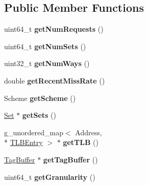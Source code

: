 \subsection*{Public Member Functions}
\begin{DoxyCompactItemize}
\item 
\hypertarget{classMemoryController_a954c83dcfb021d356b6a03b796110791}{uint64\-\_\-t {\bfseries get\-Num\-Requests} ()}\label{classMemoryController_a954c83dcfb021d356b6a03b796110791}

\item 
\hypertarget{classMemoryController_ae32701d4737c7518a8a1d6b4bc5f58ab}{uint64\-\_\-t {\bfseries get\-Num\-Sets} ()}\label{classMemoryController_ae32701d4737c7518a8a1d6b4bc5f58ab}

\item 
\hypertarget{classMemoryController_a9b91469a55bf2e7828f42fec7df14322}{uint32\-\_\-t {\bfseries get\-Num\-Ways} ()}\label{classMemoryController_a9b91469a55bf2e7828f42fec7df14322}

\item 
\hypertarget{classMemoryController_a577d1654dde3a5bd84a8e2ccade2e0a8}{double {\bfseries get\-Recent\-Miss\-Rate} ()}\label{classMemoryController_a577d1654dde3a5bd84a8e2ccade2e0a8}

\item 
\hypertarget{classMemoryController_a77227b484993330e54c71663ef5ccbb8}{Scheme {\bfseries get\-Scheme} ()}\label{classMemoryController_a77227b484993330e54c71663ef5ccbb8}

\item 
\hypertarget{classMemoryController_a4c35c12f7b4b6064d0a84a5ed7381671}{\hyperlink{classSet}{Set} $\ast$ {\bfseries get\-Sets} ()}\label{classMemoryController_a4c35c12f7b4b6064d0a84a5ed7381671}

\item 
\hypertarget{classMemoryController_a9af52086365c800782273046a1001128}{g\-\_\-unordered\-\_\-map$<$ Address, \\*
\hyperlink{classTLBEntry}{T\-L\-B\-Entry} $>$ $\ast$ {\bfseries get\-T\-L\-B} ()}\label{classMemoryController_a9af52086365c800782273046a1001128}

\item 
\hypertarget{classMemoryController_ad6a50645544168a3a74316580e4c5a2d}{\hyperlink{classTagBuffer}{Tag\-Buffer} $\ast$ {\bfseries get\-Tag\-Buffer} ()}\label{classMemoryController_ad6a50645544168a3a74316580e4c5a2d}

\item 
\hypertarget{classMemoryController_af68626e7f49f2190c399f6252f06b078}{uint64\-\_\-t {\bfseries get\-Granularity} ()}\label{classMemoryController_af68626e7f49f2190c399f6252f06b078}


\end{DoxyCompactItemize}
